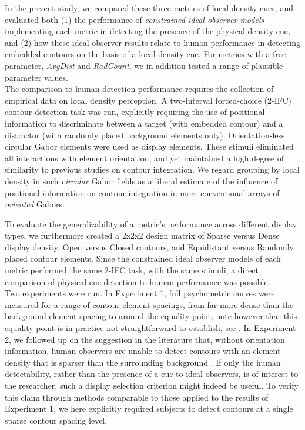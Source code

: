 \documentclass[12pt]{article}
\begin{document}
In the present study, we compared these three metrics of local density cues, and evaluated both (1) the performance of \emph{constrained ideal observer models} implementing each metric in detecting the presence of the physical density cue, and (2) how these ideal observer results relate to human performance in detecting embedded contours on the basis of a local density cue. For metrics with a free parameter, \emph{AvgDist} and \emph{RadCount}, we in addition tested a range of plausible parameter values.\\

The comparison to human detection performance requires the collection of empirical data on local density perception. A two-interval forced-choice (2-IFC) contour detection task was run, explicitly requiring the use of positional information to discriminate between a target (with embedded contour) and a distractor (with randomly placed background elements only). Orientation-less circular Gabor elements were used as display elements. These stimuli eliminated all interactions with element orientation, and yet maintained a high degree of similarity to previous studies on contour integration. We regard grouping by local density in such \emph{circular} Gabor fields as a liberal estimate of the influence of positional information on contour integration in more conventional arrays of \emph{oriented} Gabors.

To evaluate the generalizability of a metric's performance across different display types, we furthermore created a 2x2x2 design matrix of Sparse versus Dense display density, Open versus Closed contours, and Equidistant versus Randomly placed contour elements.
Since the constrained ideal observer models of each metric performed the same 2-IFC task, with the same stimuli, a direct comparison of physical cue detection to human performance was possible.\\ 

Two experiments were run. In Experiment 1, full psychometric curves were measured for a range of contour element spacings, from far more dense than the background element spacing to around the equality point; note however that this equality point is in practice not straightforward to establish, see . In Experiment 2, we followed up on the suggestion in the literature that, without orientation information, human observers are unable to detect contours with an element density that is sparser than the surrounding background \cite{Kovacs99}. If only the human detectability, rather than the presence of a cue to ideal observers, is of interest to the researcher, such a display selection criterion might indeed be useful. To verify this claim through methods comparable to those applied to the results of Experiment 1, we here explicitly required subjects to detect contours at a single sparse contour spacing level.
\end{document}
